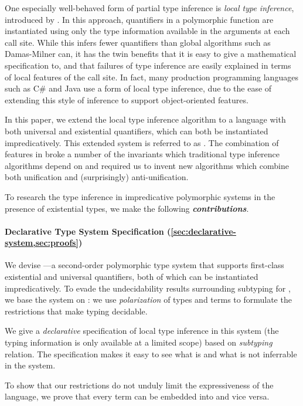 One especially well-behaved form of partial type inference is 
\emph{local type inference}, introduced by \citet{pierce2000:local}. In this approach,
quantifiers in a polymorphic function are instantiated using only the type
information available in the arguments at each call site. While this infers
fewer quantifiers than global algorithms such as Damas-Milner can, it has the
twin benefits that it is easy to give a mathematical specification to, and that
failures of type inference are easily explained in terms of local features of
the call site. In fact, many production programming languages such as C\# and
Java use a form of local type inference, due to the ease of extending this style
of inference to support object-oriented features. 

In this paper, we extend the local type inference algorithm to a language with
both universal and existential quantifiers, which can both be instantiated
impredicatively. This extended system is referred to as \fexists. The
combination of features in \fexists  broke a number of the invariants which
traditional type inference algorithms depend on and required us to invent
new algorithms which combine both unification and (surprisingly)
anti-unification.

To research the type inference in impredicative polymorphic systems in the
presence of existential types, we make the following
\emph{\textbf{contributions}}.

\paragraph{Declarative Type System Specification (\cref{sec:declarative-system,sec:proofs})} 
    We devise \fexists---a second-order polymorphic type system that supports first-class
    existential and universal quantifiers, both of which can be instantiated
    impredicatively. To evade the undecidability results surrounding subtyping
    for \systemf, we base the system on \CBPV \cite{levy2006:cbpv}: we
    use \emph{polarization} of types and terms to formulate the restrictions
    that make typing decidable. 

    We give a \emph{declarative} specification of local type inference in this
    system (\ie the typing information is only available at a limited scope)
    based on \emph{subtyping} relation. The specification makes it easy to see
    what is and what is not inferrable in the system. 

    To show that our restrictions do not unduly limit the expressiveness of the
    language, we prove that every \fexists term can be embedded into \systemf
    and vice versa.

